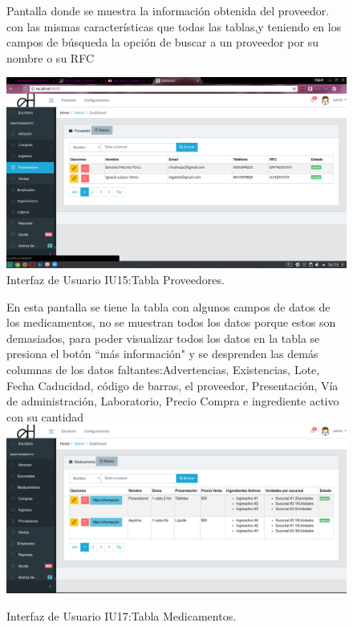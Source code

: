 \begin{figure}[htbp!]
	\begin{center}
	Pantalla donde se muestra la información obtenida del proveedor.
	con las mismas características que todas las tablas,y teniendo en los campos de búsqueda la opción de buscar a un proveedor por su nombre o su RFC
	
\includegraphics[width=\textwidth]{Pantallas/tablaProveedores}
		\caption{Interfaz de Usuario IU15:Tabla Proveedores.}
	\end{center}
\end{figure}





\begin{figure}[htbp!]
	\begin{center}
	En esta pantalla se tiene la tabla con algunos campos de datos de los medicamentos, no se muestran todos los datos porque estos son demasiados, 
	para poder visualizar todos los datos en la tabla se presiona el botón ``más información" y se desprenden las demás columnas de los datos faltantes:Advertencias, Existencias,  Lote, Fecha Caducidad, código de barras, el proveedor, Presentación, Vía de administración, Laboratorio, Precio Compra e ingrediente activo con su cantidad
\includegraphics[width=\textwidth]{Pantallas/TablaMedicamentos}
		\caption{Interfaz de Usuario IU17:Tabla Medicamentos.}
	\end{center}
\end{figure}



